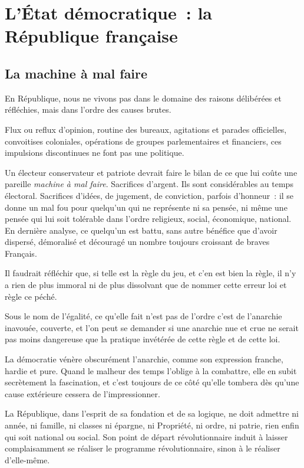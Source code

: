 \documentclass[french,twoside]{book} %
\begin{document}
\section[{L’État démocratique : la République française}]{L’État démocratique : la République française}
\subsection[{La machine à mal faire}]{La machine à mal faire}
\noindent En République, nous ne vivons pas dans le domaine des raisons délibérées et réfléchies, mais dans l’ordre des causes brutes.\par
Flux ou reflux d’opinion, routine des bureaux, agitations et parades officielles, convoitises coloniales, opérations de groupes parlementaires et financiers, ces impulsions discontinues ne font pas une politique.\par
Un électeur conservateur et patriote devrait faire le bilan de ce que lui coûte une pareille \emph{machine à mal faire}. Sacrifices d’argent. Ils sont considérables au temps électoral. Sacrifices d’idées, de jugement, de conviction, parfois d’honneur : il se donne un mal fou pour quelqu’un qui ne représente ni sa pensée, ni même une pensée qui lui soit tolérable dans l’ordre religieux, social, économique, national. En dernière analyse, ce quelqu’un est battu, sans autre bénéfice que d’avoir dispersé, démoralisé et découragé un nombre toujours croissant de braves Français.\par
Il faudrait réfléchir que, si telle est la règle du jeu, et c’en est bien la règle, il n’y a rien de plus immoral ni de plus dissolvant que de nommer cette erreur loi et règle ce péché.\par
Sous le nom de l’égalité, ce qu’elle fait n’est pas de l’ordre c’est de l’anarchie inavouée, couverte, et l’on peut se demander si une anarchie nue et crue ne serait pas moins dangereuse que la pratique invétérée de cette règle et de cette loi.\par
La démocratie vénère obscurément l’anarchie, comme son expression franche, hardie et pure. Quand le malheur des temps l’oblige à la combattre, elle en subit secrètement la fascination, et c’est toujours de ce côté qu’elle tombera dès qu’une cause extérieure cessera de l’impressionner.\par
La République, dans l’esprit de sa fondation et de sa logique, ne doit admettre ni année, ni famille, ni classes ni épargne, ni Propriété, ni ordre, ni patrie, rien enfin qui soit national ou social. Son point de départ révolutionnaire induit à laisser complaisamment se réaliser le programme révolutionnaire, sinon à le réaliser d’elle-même.\par
\end{document}
